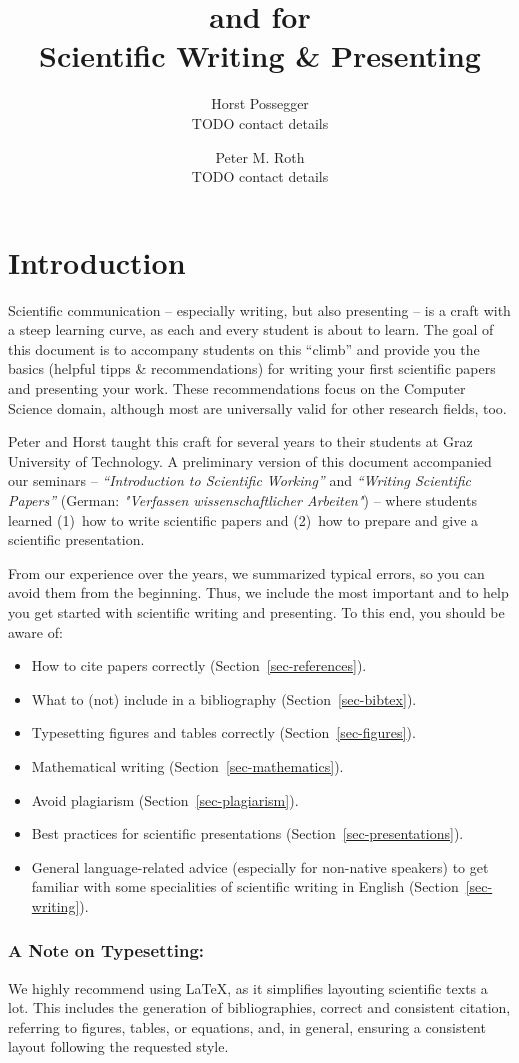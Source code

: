 \documentclass[11pt,a4paper]{article}
\author{
Horst Possegger\\[1mm]
{\small TODO contact details}
\and
Peter M. Roth\\[1mm]
{\small TODO contact details}
}
\title{\goodstyle{Dos} and \badstyle{Don'ts} for\\[0.5em]Scientific Writing \& Presenting}
\begin{document}
\tableofcontents
\pagebreak

\section{Introduction}
\label{sec-intro}
Scientific communication -- especially writing, but also presenting -- is a craft with a steep learning curve, as each and every student is about to learn.
The goal of this document is to accompany students on this ``climb'' and provide you the basics (helpful tipps \& recommendations) for writing your first scientific papers and presenting your work.
These recommendations focus on the Computer Science domain, although most are universally valid for other research fields, too.

Peter and Horst taught this craft for several years to their students at Graz University of Technology.
A preliminary version of this document accompanied our seminars -- \emph{``Introduction to Scientific Working''} and \emph{``Writing Scientific Papers''} (German: \emph{"Verfassen wissenschaftlicher Arbeiten"}) -- where students learned (1)~how to write scientific papers and (2)~how to prepare and give a scientific presentation. 

From our experience over the years, we summarized typical errors, so you can avoid them from the beginning.
Thus, we include the most important  and  to help you get started with scientific writing and presenting.
To this end, you should be aware of:
\begin{itemize}
\item How to cite papers correctly (Section~\ref{sec-references}).
\item What to (not) include in a bibliography (Section~\ref{sec-bibtex}).
\item Typesetting figures and tables correctly (Section~\ref{sec-figures}).
\item Mathematical writing (Section~\ref{sec-mathematics}).
\item Avoid plagiarism (Section~\ref{sec-plagiarism}).
\item Best practices for scientific presentations (Section~\ref{sec-presentations}).
\item General language-related advice (especially for non-native speakers) to get familiar with some specialities of scientific writing in English (Section~\ref{sec-writing}).
\end{itemize}

\subsubsection*{A Note on Typesetting:}
We highly recommend using \LaTeX, as it simplifies layouting scientific texts a lot.
This includes the generation of bibliographies, correct and consistent citation, referring to figures, tables, or equations, and, in general, ensuring a consistent layout following the requested style. 
\end{document}
